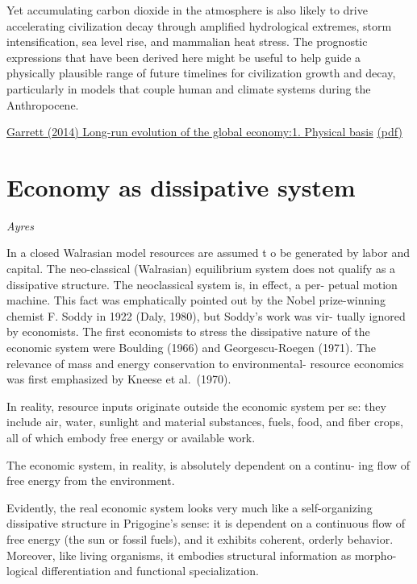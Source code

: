 \documentclass[
]{book}
\begin{document}
Yet accumulating carbon dioxide in the atmosphere is also likely to drive accelerating civilization decay
through ampliﬁed hydrological extremes, storm intensiﬁcation, sea level rise, and mammalian heat stress. The
prognostic expressions that have been derived here might be useful to help guide a physically plausible
range of future timelines for civilization growth and decay, particularly in models that couple human and
climate systems during the Anthropocene.

\href{http://dx.doi.org/info:doi/10.1002/2013EF000171}{Garrett (2014) Long-run evolution of the global economy:1. Physical basis}
\href{pdf/Garrett_2014_Long-run_Evolution_of_Global_Economy_1_Physical_Basis.pdf}{(pdf)}

\hypertarget{economy-as-dissipative-system}{%
\section{Economy as dissipative system}\label{economy-as-dissipative-system}}

\emph{Ayres}

In a closed Walrasian model resources are assumed t o be generated by
labor and capital. The neo-classical (Walrasian) equilibrium system does not
qualify as a dissipative structure. The neoclassical system is, in effect, a per-
petual motion machine. This fact was emphatically pointed out by the Nobel
prize-winning chemist F. Soddy in 1922 (Daly, 1980), but Soddy's work was vir-
tually ignored by economists.
The first economists to stress the dissipative
nature of the economic system were Boulding (1966) and Georgescu-Roegen
(1971). The relevance of mass and energy conservation to environmental-
resource economics was first emphasized by Kneese et al.~(1970).

In reality, resource inputs originate outside the economic system per se:
they include air, water, sunlight and material substances, fuels, food, and fiber
crops, all of which embody free energy or available work.

The economic system, in reality, is absolutely dependent on a continu-
ing flow of free energy from the environment.

Evidently, the real economic system looks very much like a self-organizing
dissipative structure in Prigogine's sense: it is dependent on a continuous flow of
free energy (the sun or fossil fuels), and it exhibits coherent, orderly behavior.
Moreover, like living organisms, it embodies structural information as morpho-
logical differentiation and functional specialization.
\end{document}
